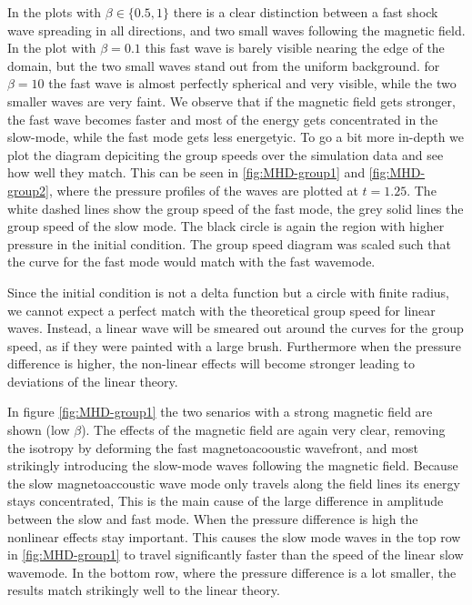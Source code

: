 In the plots with $\beta \in \{0.5,1\}$ there is a clear distinction between a fast shock wave spreading in all directions, and two small waves following the magnetic field.
In the plot with $\beta=0.1$ this fast wave is barely visible nearing the edge of the domain, but the two small waves stand out from the uniform background.
for $\beta=10$ the fast wave is almost perfectly spherical and very visible, while the two smaller waves are very faint.
We observe that if the magnetic field gets stronger, the fast wave becomes faster and most of the energy gets concentrated in the slow-mode, while the fast mode gets less energetyic.
To go a bit more in-depth we plot the diagram depiciting the group speeds over the simulation data and see how well they match. 
This can be seen in \cref{fig:MHD-group1} and \cref{fig:MHD-group2}, where the pressure profiles of the waves are plotted at $t=1.25$.
The white dashed lines show the group speed of the fast mode, the grey solid lines the group speed of the slow mode. 
The black circle is again the region with higher pressure in the initial condition.
The group speed diagram was scaled such that the curve for the fast mode would match with the fast wavemode.

Since the initial condition is not a delta function but a circle with finite radius, we cannot expect a perfect match with the theoretical group speed for linear waves.
Instead, a linear wave will be smeared out around the curves for the group speed, as if they were painted with a large brush.
Furthermore when the pressure difference is higher, the non-linear effects will become stronger leading to deviations of the linear theory.

In figure \cref{fig:MHD-group1} the two senarios with a strong magnetic field are shown (low $\beta$).
The effects of the magnetic field are again very clear, removing the isotropy by deforming the fast magnetoacooustic wavefront, and most strikingly introducing the slow-mode waves following the magnetic field.
Because the slow magnetoaccoustic wave mode only travels along the field lines its energy stays concentrated, This is the main cause of the large difference in amplitude between the slow and fast mode.
When the pressure difference is high the nonlinear effects stay important. 
This causes the slow mode waves in the top row in \cref{fig:MHD-group1} to travel significantly faster than the speed of the linear slow wavemode.
In the bottom row, where the pressure difference is a lot smaller, the results match strikingly well to the linear theory.

